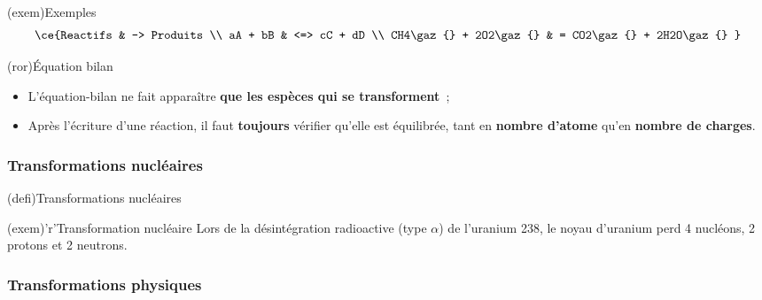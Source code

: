 \documentclass[../../main/main.tex]{subfiles}
\begin{document}
\begin{tcb}(exem){Exemples}
	\vspace{-15pt}
	\begin{align*}
		\ce{Reactifs          & -> Produits
		\\
		aA + bB               & <=> cC + dD
		\\
		CH4\gaz{} + 2O2\gaz{} & = CO2\gaz{} + 2H2O\gaz{}
		}
	\end{align*}
\end{tcb}

\begin{tcb}[label=rema:eqbil](ror){Équation bilan}
	\begin{itemize}
		\item L'équation-bilan ne fait apparaître \textbf{que les espèces qui se
			      transforment}~;
		\item Après l'écriture d'une réaction, il faut \textbf{toujours}
		      vérifier qu'elle est équilibrée, tant en \textbf{nombre d'atome}
		      qu'en \textbf{nombre de charges}.
	\end{itemize}
\end{tcb}

\subsubsection{Transformations nucléaires}

\begin{tcbraster}[raster columns=2, raster equal height=rows]
	\begin{tcb}[label=def:transnuc](defi){Transformations nucléaires}
	\end{tcb}
	\begin{tcb}[label=exem:transnuc](exem)'r'{Transformation nucléaire}
		Lors de la désintégration radioactive (type $\alpha$) de l'uranium 238,
		le noyau d'uranium perd 4 nucléons, 2 protons et 2 neutrons.
		\csw{
		\[
			\ce{^{238}_{92}U}
			\longrightarrow
			\ce{^{234}_{90}Th + ^{4}_{2}He}
		\]
		}
		\vspace{-15pt}
	\end{tcb}
\end{tcbraster}

\subsubsection{Transformations physiques}
\end{document}
